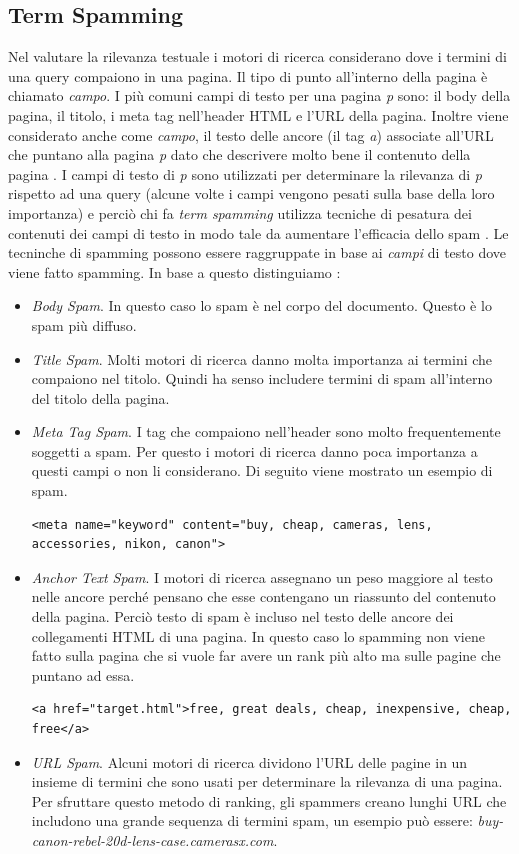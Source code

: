 \subsection{Term Spamming}
Nel valutare la rilevanza testuale i motori di ricerca considerano dove i termini di una query compaiono in una pagina. Il tipo di punto all'interno della pagina è chiamato \textit{campo}. I più comuni campi di testo per una pagina \textit{p} sono: il body della pagina, il titolo, i meta tag nell'header HTML e l'URL della pagina. Inoltre viene considerato anche come \textit{campo}, il testo delle ancore (il tag \textit{a}) associate all'URL che puntano alla pagina \textit{p} dato che descrivere molto bene il contenuto della pagina . I campi di testo  di \textit{p} sono utilizzati per determinare la rilevanza di \textit{p} rispetto ad una query (alcune volte i campi vengono pesati sulla base della loro importanza) e perciò chi fa \textit{term spamming} utilizza tecniche di pesatura dei contenuti dei campi di testo in modo tale da aumentare l'efficacia dello spam \cite{ilprints646}. Le tecninche di spamming possono essere raggruppate in base ai \textit{campi} di testo dove viene fatto spamming. In base a questo distinguiamo \cite{ilprints646}:
\begin{itemize}
\item \textit{Body Spam}. In questo caso lo spam è nel corpo del documento. Questo è lo spam più diffuso.
\item \textit{Title Spam}. Molti motori di ricerca danno molta importanza ai termini che compaiono nel titolo. Quindi ha senso includere termini di spam all'interno del titolo della pagina.
\item \textit{Meta Tag Spam}. I tag che compaiono nell'header sono molto frequentemente soggetti a spam. Per questo i motori di ricerca danno poca importanza a questi campi o non li considerano. Di seguito viene mostrato un esempio di spam.
\begin{lstlisting}[frame=trbl,postbreak=\space, breakindent=5pt, breaklines]
 <meta name="keyword" content="buy, cheap, cameras, lens, accessories, nikon, canon">
\end{lstlisting}
\item \textit{Anchor Text Spam}. I motori di ricerca assegnano un peso maggiore al testo nelle ancore perché pensano che esse contengano un riassunto del contenuto della pagina. Perciò testo di spam è incluso nel testo delle ancore dei collegamenti HTML di una pagina. In questo caso lo spamming non viene fatto sulla pagina che si vuole far avere un rank più alto ma sulle pagine che puntano ad essa.
\begin{lstlisting}[frame=trbl,postbreak=\space, breakindent=5pt, breaklines]
<a href="target.html">free, great deals, cheap, inexpensive, cheap, free</a>
\end{lstlisting}
\item \textit{URL Spam}. Alcuni motori di ricerca dividono l'URL delle pagine in un insieme di termini che sono usati per determinare la rilevanza di una pagina. Per sfruttare questo metodo di ranking, gli spammers creano lunghi URL che includono una grande sequenza di termini spam, un esempio può essere: \textit{buy-canon-rebel-20d-lens-case.camerasx.com}.
\end{itemize}

